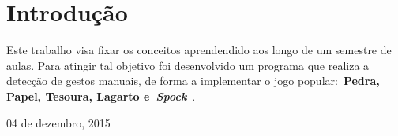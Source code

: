 \documentclass[conference]{Trabalho_Final}
\begin{document}




\maketitle






%
\IEEEpeerreviewmaketitle


\section{Introdu\c{c}\~ao}
  \label{intro}
Este trabalho visa fixar os conceitos aprendendido aos longo de um semestre de aulas. Para atingir tal objetivo foi desenvolvido um programa que realiza a detec\c{c}\~ao de gestos manuais, de forma a implementar o jogo popular:~\textbf{Pedra, Papel, Tesoura, Lagarto e~\textit{Spock}}~\cite{jogo}.
 
\hfill 04 de dezembro, 2015


%
%
\end{document}
